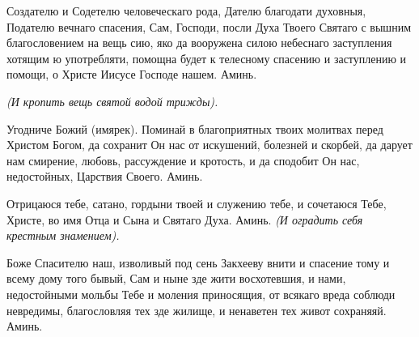 \mychapterending





Создателю и Содетелю человеческаго рода, Дателю благодати духовныя, Подателю вечнаго спасения, Сам, Господи, посли Духа Твоего Святаго с вышним благословением на вещь сию, яко да вооружена силою небеснаго заступления хотящим ю употребляти, помощна будет к телесному спасению и заступлению и помощи, о Христе Иисусе Господе нашем. Аминь. 


\itshape (И кропить вещь святой водой трижды).\normalfont{}





\mychapterending




Угодниче Божий (имярек). Поминай в благоприятных твоих молитвах перед Христом Богом, да сохранит Он нас от искушений, болезней и скорбей, да дарует нам смирение, любовь, рассуждение и кротость, и да сподобит Он нас, недостойных, Царствия Своего. Аминь.





\mychapterending






Отрицаюся тебе, сатано, гордыни твоей и служению тебе, и сочетаюся Тебе, Христе, во имя Отца и Сына и Святаго Духа. Аминь. \itshape (И оградить себя крестным знамением).\normalfont{}





\mychapterending




Боже Спасителю наш, изволивый под сень Закхееву внити и спасение тому и всему дому того бывый, Сам и ныне зде жити восхотевшия, и нами, недостойными мольбы Тебе и моления приносящия, от всякаго вреда соблюди невредимы, благословляя тех зде жилище, и ненаветен тех живот сохраняяй. Аминь. 





\mychapterending





